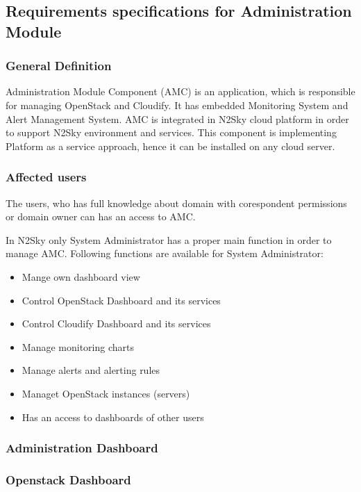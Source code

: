 \subsection{Requirements specifications for Administration Module}\label{Administration components}

\subsubsection{General Definition}\label{General Definition AMC}

Administration Module Component (AMC) is an application, which is responsible for managing OpenStack and Cloudify. It has embedded Monitoring System and Alert Management System. AMC is integrated in N2Sky cloud platform in order to support N2Sky environment and services. This component is implementing Platform as a service approach, hence it can be installed on any cloud server. 

\subsubsection{Affected users}\label{Affected users}

The users, who has full knowledge about domain with corespondent permissions or domain owner can has an access to AMC.

In N2Sky only System Administrator has a proper main function in order to manage AMC.
Following functions are available for System Administrator:
\begin{itemize}
\item Mange own dashboard view
\item Control OpenStack Dashboard and its services
\item Control Cloudify Dashboard and its services
\item Manage monitoring charts
\item Manage alerts and alerting rules
\item Managet OpenStack instances (servers)
\item Has an access to dashboards of other users
\end{itemize}

\subsubsection{Administration Dashboard}\label{Administration Dashboard}
\subsubsection{Openstack Dashboard}\label{Openstack Dashboard}
